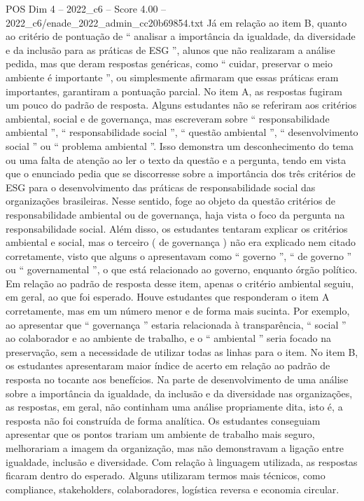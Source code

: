 \begin{textsample}{POS Dim 4 – 2022\_c6 – Score 4.00 – 2022\_c6/enade\_2022\_admin\_cc20b69854.txt}
Já em relação ao item B, quanto ao critério de pontuação de “ analisar a importância da igualdade, da diversidade e da inclusão para as práticas de ESG ”, alunos que não realizaram a análise pedida, mas que deram respostas genéricas, como “ cuidar, preservar o meio ambiente é importante ”, ou simplesmente afirmaram que essas práticas eram importantes, garantiram a pontuação parcial.
No item A, as respostas fugiram um pouco do padrão de resposta.
Alguns estudantes não se referiram aos critérios ambiental, social e de governança, mas escreveram sobre “ responsabilidade ambiental ”, “ responsabilidade social ”, “ questão ambiental ”, “ desenvolvimento social ” ou “ problema ambiental ”.
Isso demonstra um desconhecimento do tema ou uma falta de atenção ao ler o texto da questão e a pergunta, tendo em vista que o enunciado pedia que se discorresse sobre a importância dos três critérios de ESG para o desenvolvimento das práticas de responsabilidade social das organizações brasileiras.
Nesse sentido, foge ao objeto da questão critérios de responsabilidade ambiental ou de governança, haja vista o foco da pergunta na responsabilidade social.
Além disso, os estudantes tentaram explicar os critérios ambiental e social, mas o terceiro ( de governança ) não era explicado nem citado corretamente, visto que alguns o apresentavam como “ governo ”, “ de governo ” ou “ governamental ”, o que está relacionado ao governo, enquanto órgão político.
Em relação ao padrão de resposta desse item, apenas o critério ambiental seguiu, em geral, ao que foi esperado.
Houve estudantes que responderam o item A corretamente, mas em um número menor e de forma mais sucinta.
Por exemplo, ao apresentar que “ governança ” estaria relacionada à transparência, “ social ” ao colaborador e ao ambiente de trabalho, e o “ ambiental ” seria focado na preservação, sem a necessidade de utilizar todas as linhas para o item.
No item B, os estudantes apresentaram maior índice de acerto em relação ao padrão de resposta no tocante aos benefícios.
Na parte de desenvolvimento de uma análise sobre a importância da igualdade, da inclusão e da diversidade nas organizações, as respostas, em geral, não continham uma análise propriamente dita, isto é, a resposta não foi construída de forma analítica.
Os estudantes conseguiam apresentar que os pontos trariam um ambiente de trabalho mais seguro, melhorariam a imagem da organização, mas não demonstravam a ligação entre igualdade, inclusão e diversidade.
Com relação à linguagem utilizada, as respostas ficaram dentro do esperado.
Alguns utilizaram termos mais técnicos, como compliance, stakeholders, colaboradores, logística reversa e economia circular.

\end{textsample}
